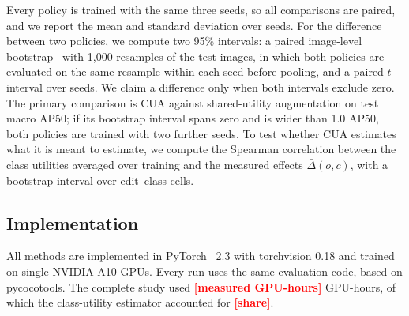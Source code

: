 \documentclass[conference]{IEEEtran}
\newcommand{\todo}[1]{\textcolor{red}{\textbf{[#1]}}}
\begin{document}
Every policy is trained with the same three seeds, so all comparisons are paired, and we report the mean and standard deviation over seeds. For the difference between two policies, we compute two 95\% intervals: a paired image-level bootstrap~\cite{efron1979} with 1,000 resamples of the test images, in which both policies are evaluated on the same resample within each seed before pooling, and a paired $t$ interval over seeds. We claim a difference only when both intervals exclude zero. The primary comparison is CUA against shared-utility augmentation on test macro AP50; if its bootstrap interval spans zero and is wider than 1.0 AP50, both policies are trained with two further seeds. To test whether CUA estimates what it is meant to estimate, we compute the Spearman correlation between the class utilities averaged over training and the measured effects $\bar\Delta(o,c)$, with a bootstrap interval over edit--class cells.

\subsection{Implementation}
\label{sec:setup_impl}

All methods are implemented in PyTorch~\cite{paszke2019pytorch} 2.3 with torchvision 0.18 and trained on single NVIDIA A10 GPUs. Every run uses the same evaluation code, based on pycocotools. The complete study used \todo{measured GPU-hours} GPU-hours, of which the class-utility estimator accounted for \todo{share}.





\end{document}
